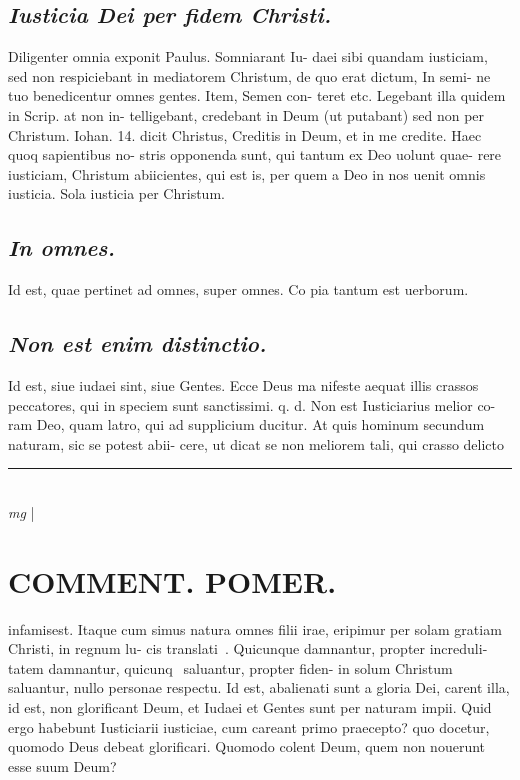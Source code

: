 \documentclass{article}
\begin{document}
\begin{pages}
\subsection*{\textit{Iusticia Dei per fidem Christi. }}\pstart Diligenter omnia exponit Paulus. Somniarant Iu- daei sibi quandam iusticiam, sed non respiciebant in mediatorem Christum, de quo erat dictum, In semi- ne tuo benedicentur omnes gentes. Item, Semen con- teret etc. Legebant illa quidem in Scrip. at non in- telligebant, credebant in Deum (ut putabant) sed non per Christum. Iohan. 14. dicit Christus, Creditis in Deum, et in me credite. Haec quoq sapientibus no- stris opponenda sunt, qui tantum ex Deo uolunt quae- rere iusticiam, Christum abiicientes, qui est is, per quem a Deo in nos uenit omnis iusticia.  Sola iusticia per Christum.   \pend
{}
{}
\subsection*{\textit{In omnes. }}\pstart Id est, quae pertinet ad omnes, super omnes. Co pia tantum est uerborum.   \pend
{}
{}
\subsection*{\textit{Non est enim distinctio. }}\pstart Id est, siue iudaei sint, siue Gentes. Ecce Deus ma nifeste aequat illis crassos peccatores, qui in speciem sunt sanctissimi. q. d. Non est Iusticiarius melior co- ram Deo, quam latro, qui ad supplicium ducitur.  At quis hominum secundum naturam, sic se potest abii- cere, ut dicat se non meliorem tali, qui crasso delicto  \pend
\vspace{0.5cm}\noindent
\vspace{0.2cm}\rule{1cm}{0.2pt}\\ 
\hspace{0.2cm}\textit{mg}
\footnotesize 
\normalsize| 
\section*{COMMENT. POMER.  }\pstart infamisest. Itaque cum simus natura omnes filii irae, eripimur per solam gratiam Christi, in regnum lu- cis translati . Quicunque damnantur, propter increduli- tatem damnantur, quicunq saluantur, propter fiden- in solum Christum saluantur, nullo personae respectu.  \pend\pstart Id est, abalienati sunt a gloria Dei, carent illa, id est, non glorificant Deum, et Iudaei et Gentes sunt per naturam impii. Quid ergo habebunt Iusticiarii iusticiae, cum careant primo praecepto? quo docetur, quomodo Deus debeat glorificari. Quomodo colent Deum, quem non nouerunt esse suum Deum?  \pend
{}
{}

\end{pages}
\end{document}
